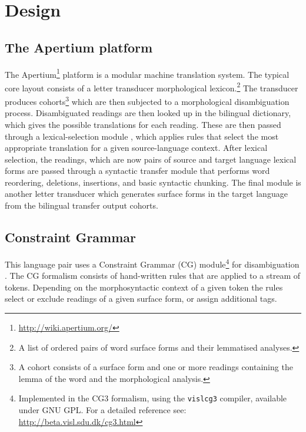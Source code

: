 \section{Design}
\subsection{The Apertium platform}

The Apertium\footnote{\url{http://wiki.apertium.org/}} platform \cite{forcada2011apertium} is a
modular machine translation system. The typical core layout consists
of a letter transducer morphological lexicon.\footnote{A list of
ordered pairs of word surface forms and their lemmatised
analyses.} The transducer produces cohorts\footnote{A cohort 
consists of a surface form and one or more readings containing the lemma of the 
word and the morphological analysis.} which are then subjected to a
morphological disambiguation process.
%
Disambiguated readings are then looked up in the bilingual dictionary,
which gives the possible translations for each reading. These
are then passed through a lexical-selection module \cite{tyers12a}, 
which applies rules that select the most appropriate translation
for a given source-language context.
After lexical selection, the readings, which are now pairs of source
and target language lexical forms are passed through a 
syntactic transfer module that performs word reordering, deletions,
insertions, and basic syntactic chunking.
%
The final module is another letter transducer which generates
surface forms in the target language from the bilingual transfer
output cohorts.

\subsection{Constraint Grammar}
This language pair uses a Constraint Grammar (CG)
module\footnote{Implemented in the CG3 formalism, using the
  \texttt{vislcg3} compiler, available under GNU GPL. For a detailed
  reference see: \url{http://beta.visl.sdu.dk/cg3.html}} for
disambiguation \cite{karlsson1995constraint}. The CG formalism consists of hand-written rules that
are applied to a stream of tokens. Depending on the morphosyntactic
context of a given token the rules select or exclude readings of a
given surface form, or assign additional tags.
